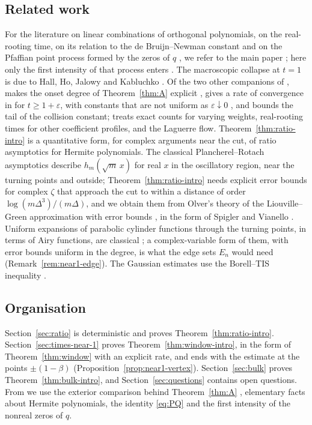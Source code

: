\documentclass[11pt]{amsart}
\theoremstyle{definition}
\theoremstyle{remark}
\numberwithin{equation}{section}
\newcommand{\eps}{\varepsilon}
\begin{document}
\subsection{Related work}
For the literature on linear combinations of orthogonal polynomials, on the real-rooting time, on its relation to the de Bruijn--Newman constant \cite{dB,Ne,RT} and on the Pfaffian point process formed by the zeros of $q$ \cite{Fo,MS}, we refer to the main paper \cite{Main}; here only the first intensity of that process enters \cite[Theorem~2.7]{MS}. The macroscopic collapse at $t=1$ is due to Hall, Ho, Jalowy and Kabluchko \cite{HHJK}. Of the two other companions of \cite{Main}, \cite{CompA} makes the onset degree of Theorem~\ref{thm:A} explicit \cite[Theorem~\ref{A-thm:quant-main}]{CompA}, gives a rate of convergence in \cite[Theorem~\ref{M-cor:weyl}]{Main} for $t\ge1+\eps$, with constants that are not uniform as $\eps\downarrow0$ \cite[Theorem~\ref{A-thm:rate}]{CompA}, and bounds the tail of the collision constant; \cite{CompC} treats exact counts for varying weights, real-rooting times for other coefficient profiles, and the Laguerre flow. Theorem~\ref{thm:ratio-intro} is a quantitative form, for complex arguments near the cut, of ratio asymptotics for Hermite polynomials. The classical Plancherel--Rotach asymptotics \cite[Theorem~8.22.9]{Sz} describe $h_m(\sqrt m\,x)$ for real $x$ in the oscillatory region, near the turning points and outside; Theorem~\ref{thm:ratio-intro} needs explicit error bounds for complex $\zeta$ that approach the cut to within a distance of order $\log(m\Delta^3)/(m\Delta)$, and we obtain them from Olver's theory of the Liouville--Green approximation with error bounds \cite[Chapter~6]{Ol}, in the form of Spigler and Vianello \cite{SV}. Uniform expansions of parabolic cylinder functions through the turning points, in terms of Airy functions, are classical \cite[\S12.10]{DLMF}; a complex-variable form of them, with error bounds uniform in the degree, is what the edge sets $E_n$ would need (Remark~\ref{rem:near1-edge}). The Gaussian estimates use the Borell--TIS inequality \cite[Theorem~2.1.1]{AT}.

\subsection{Organisation}
Section~\ref{sec:ratio} is deterministic and proves Theorem~\ref{thm:ratio-intro}. Section~\ref{sec:times-near-1} proves Theorem~\ref{thm:window-intro}, in the form of Theorem~\ref{thm:window} with an explicit rate, and ends with the estimate at the points $\pm(1-\beta)$ (Proposition~\ref{prop:near1-vertex}). Section~\ref{sec:bulk} proves Theorem~\ref{thm:bulk-intro}, and Section~\ref{sec:questions} contains open questions. From \cite{Main} we use the exterior comparison behind Theorem~\ref{thm:A} \cite[Proposition~\ref{M-prop:exterior}]{Main}, elementary facts about Hermite polynomials, the identity \eqref{eq:PQ} and the first intensity of the nonreal zeros of $q$.
\end{document}
